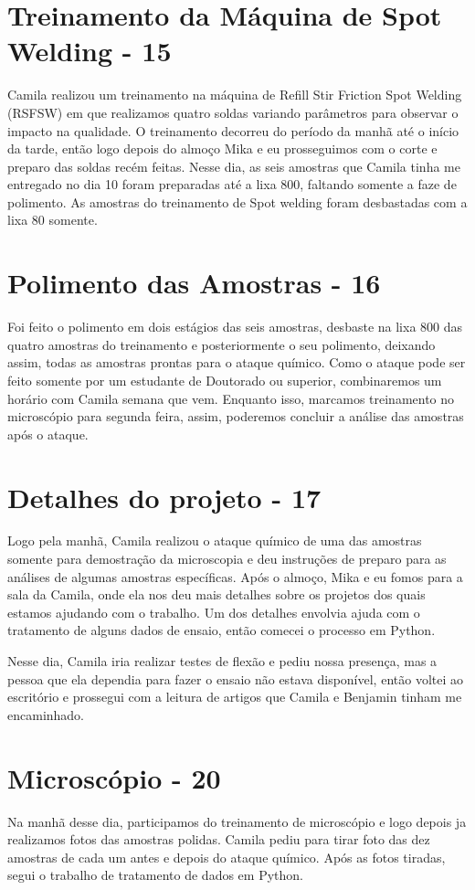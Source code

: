 \section{Treinamento da Máquina de Spot Welding - 15}
Camila realizou um treinamento na máquina de Refill Stir Friction Spot Welding (RSFSW) em que realizamos quatro soldas variando parâmetros para observar o impacto na qualidade. O treinamento decorreu do período da manhã até o início da tarde, então logo depois do almoço Mika e eu prosseguimos com o corte e preparo das soldas recém feitas. Nesse dia, as seis amostras que Camila tinha me entregado no dia 10 foram preparadas até a lixa 800, faltando somente a faze de polimento. As amostras do treinamento de Spot welding foram desbastadas com a lixa 80 somente.

\section{Polimento das Amostras - 16}

Foi feito o polimento em dois estágios das seis amostras, desbaste na lixa 800 das quatro amostras do treinamento e posteriormente o seu polimento, deixando assim, todas as amostras prontas para o ataque químico. Como o ataque pode ser feito somente por um estudante de Doutorado ou superior, combinaremos um horário com Camila semana que vem. Enquanto isso, marcamos treinamento no microscópio para segunda feira, assim, poderemos concluir a análise das amostras após o ataque. 

\section{Detalhes do projeto - 17}
Logo pela manhã, Camila realizou o ataque químico de uma das amostras somente para demostração da microscopia e deu instruções de preparo para as análises de algumas amostras específicas. Após o almoço, Mika e eu fomos para a sala da Camila, onde ela nos deu mais detalhes sobre os projetos dos quais estamos ajudando com o trabalho. Um dos detalhes envolvia ajuda com o tratamento de alguns dados de ensaio, então comecei o processo em Python. 

Nesse dia, Camila iria realizar testes de flexão e pediu nossa presença, mas a pessoa que ela dependia para fazer o ensaio não estava disponível, então voltei ao escritório e prossegui com a leitura de artigos que Camila e Benjamin tinham me encaminhado.

\section{Microscópio - 20}
Na manhã desse dia, participamos do treinamento de microscópio e logo depois ja realizamos fotos das amostras polidas. Camila pediu para tirar foto das dez amostras de cada um antes e depois do ataque químico. Após as fotos tiradas, segui o trabalho de tratamento de dados em Python.

